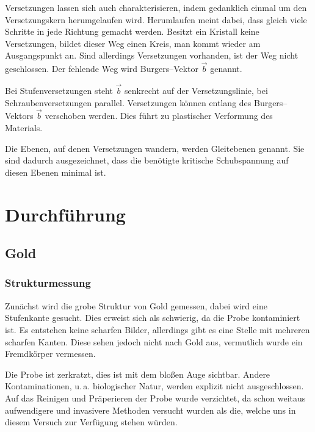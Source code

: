 \documentclass[12pt,a4paper]{scrartcl}
\numberwithin{equation}{section} %
\begin{document}
Versetzungen lassen sich auch charakterisieren, indem gedanklich einmal um den Versetzungskern herumgelaufen wird. Herumlaufen meint dabei, dass gleich viele Schritte in jede Richtung gemacht werden. Besitzt ein Kristall keine Versetzungen, bildet dieser Weg einen Kreis, man kommt wieder am Ausgangspunkt an. Sind allerdings Versetzungen vorhanden, ist der Weg nicht geschlossen. Der fehlende Weg wird Burgers--Vektor $\vec{b}$ genannt.

Bei Stufenversetzungen steht $\vec{b}$ senkrecht auf der Versetzungslinie, bei Schraubenversetzungen parallel. \cite{Gross} %
Versetzungen können entlang des Burgers--Vektors $\vec{b}$ verschoben werden. Dies führt zu plastischer Verformung des Materials.

Die Ebenen, auf denen Versetzungen wandern, werden Gleitebenen genannt. Sie sind dadurch ausgezeichnet, dass die benötigte kritische Schubspannung auf diesen Ebenen minimal ist.

\clearpage
\hypertarget{durchfuxfchrung}{%
\section{Durchführung}\label{durchfuxfchrung}}

\hypertarget{gold}{%
\subsection{Gold}\label{gold}}

\hypertarget{strukturmessung}{%
\subsubsection{Strukturmessung}\label{strukturmessung}}

Zunächst wird die grobe Struktur von Gold gemessen, dabei wird eine Stufenkante gesucht. Dies erweist sich als schwierig, da die Probe kontaminiert ist. Es entstehen keine scharfen Bilder, allerdings gibt es eine Stelle mit mehreren scharfen Kanten. Diese sehen jedoch nicht nach Gold aus, vermutlich wurde ein Fremdkörper vermessen.

Die Probe ist zerkratzt, dies ist mit dem bloßen Auge sichtbar. Andere Kontaminationen, u.\,a. biologischer Natur, werden explizit nicht ausgeschlossen. Auf das Reinigen und Präperieren der Probe wurde verzichtet, da schon weitaus aufwendigere und invasivere Methoden versucht wurden als die, welche uns in diesem Versuch zur Verfügung stehen würden.
\end{document}
